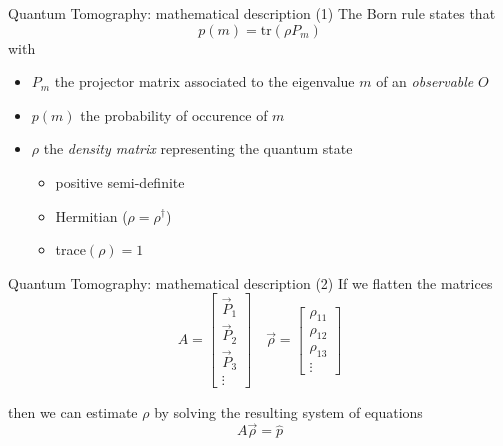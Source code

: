 \documentclass{beamer}
\newcommand{\tr}{\text{tr}}
\begin{document}
\begin{frame}{Quantum Tomography: mathematical description (1)}
    The Born rule states that
    \begin{equation}
        p(m) = \tr(\rho P_m)
    \end{equation}
    with
    \begin{itemize}
        \item $P_m$ the projector matrix associated to the eigenvalue $m$ of an \textit{observable} $O$
        \item $p(m)$ the probability of occurence  of $m$
        \item $\rho$ the \textit{density matrix} representing the quantum state
        \begin{itemize}
            \item positive semi-definite
            \item Hermitian ($\rho = \rho^\dagger$)
            \item trace$(\rho)=1$
        \end{itemize}
    \end{itemize}
\end{frame}
\begin{frame}{Quantum Tomography: mathematical description (2)}
    If we flatten the matrices
    \begin{equation}
        A = \begin{bmatrix}
            \vec P_1\\
            \vec P_2\\
            \vec P_3\\
            \vdots
        \end{bmatrix}
        \quad\vec{\rho} = \begin{bmatrix}
            \rho_{11} \\
            \rho_{12} \\
            \rho_{13} \\
            \vdots
        \end{bmatrix}
    \end{equation}

    then we can estimate $\rho$ by solving the resulting system of equations 
    \begin{equation}
        A\vec{\rho} = \hat p
    \end{equation}
\end{frame}
\end{document}
